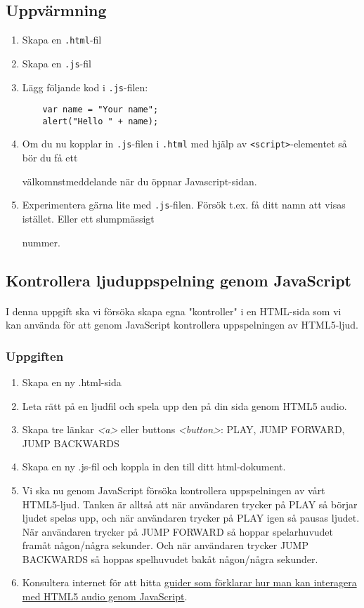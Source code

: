 \documentclass{article}
\begin{document}
\subsection*{Uppvärmning}
\begin{enumerate}
	\item Skapa en \texttt{.html}-fil
	\item Skapa en \texttt{.js}-fil
	\item Lägg följande kod i \texttt{.js}-filen:
	\begin{lstlisting}
	var name = "Your name";
	alert("Hello " + name);
	\end{lstlisting}
	\item Om du nu kopplar in \texttt{.js}-filen i \texttt{.html} med hjälp av \texttt{<script>}-elementet så bör du få ett 
	
	välkomnstmeddelande när du öppnar Javascript-sidan.
	\item Experimentera gärna lite med \texttt{.js}-filen. Försök t.ex. få ditt namn att visas istället. Eller ett slumpmässigt 
	
	nummer.
\end{enumerate}

  \subsection{ Kontrollera ljuduppspelning genom JavaScript }
    \paragraph{}
    I denna uppgift ska vi försöka skapa egna "kontroller" i en HTML-sida som vi kan använda för att genom JavaScript kontrollera uppspelningen av HTML5-ljud.

    \subsubsection*{Uppgiften}
      \begin{enumerate}
        \item Skapa en ny .html-sida
        \item Leta rätt på en ljudfil och spela upp den på din sida genom HTML5 audio.
        \item Skapa tre länkar \emph{<a>} eller buttons \emph{<button>}: PLAY, JUMP FORWARD, JUMP BACKWARDS
        \item Skapa en ny .js-fil och koppla in den till ditt html-dokument.
        \item Vi ska nu genom JavaScript försöka kontrollera uppspelningen av vårt HTML5-ljud. Tanken är alltså att när användaren trycker på PLAY så börjar ljudet spelas upp, och när användaren trycker på PLAY igen så pausas ljudet. När användaren trycker på JUMP FORWARD så hoppar spelarhuvudet framåt någon/några sekunder. Och när användaren trycker JUMP BACKWARDS så hoppas spelhuvudet bakåt någon/några sekunder.
        \item Konsultera internet för att hitta \href{https://msdn.microsoft.com/en-us/library/gg589489(v=vs.85).aspx}{guider som förklarar hur man kan interagera med HTML5 audio genom JavaScript}.
      \end{enumerate}
\end{document}
